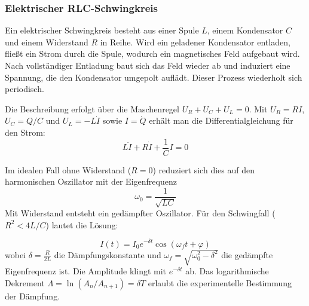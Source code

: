 \subsubsection{Elektrischer RLC-Schwingkreis}
Ein elektrischer Schwingkreis besteht aus einer Spule \(L\), einem Kondensator \(C\) und einem Widerstand \(R\) in Reihe. Wird ein geladener Kondensator entladen, fließt ein Strom durch die Spule, wodurch ein magnetisches Feld aufgebaut wird. Nach vollständiger Entladung baut sich das Feld wieder ab und induziert eine Spannung, die den Kondensator umgepolt auflädt. Dieser Prozess wiederholt sich periodisch.

Die Beschreibung erfolgt über die Maschenregel \(U_R + U_C + U_L = 0\). Mit \(U_R = RI\), \(U_C = Q/C\) und \(U_L = -L\dot{I}\) sowie \(I = \dot{Q}\) erhält man die Differentialgleichung für den Strom:
\begin{equation} \label{eq:rlc_diffgl} L \ddot{I} + R \dot{I} + \frac{1}{C} I = 0 \end{equation}

Im idealen Fall ohne Widerstand (\(R=0\)) reduziert sich dies auf den harmonischen Oszillator mit der Eigenfrequenz
\begin{equation} \label{eq:omega_0_the}
    \omega_0 = \frac{1}{\sqrt{LC}}
\end{equation}
Mit Widerstand entsteht ein gedämpfter Oszillator. Für den Schwingfall (\(R^2 < 4L/C\)) lautet die Lösung:

\begin{equation} \label{eq:rlc_loesung} I(t) = I_0 e^{-\delta t} \cos(\omega_f t + \varphi) \end{equation}
wobei \(\delta = \frac{R}{2L}\) die Dämpfungskonstante und \(\omega_f = \sqrt{\omega_0^2 - \delta^2}\) die gedämpfte Eigenfrequenz ist. Die Amplitude klingt mit \(e^{-\delta t}\) ab. Das logarithmische Dekrement \(\Lambda = \ln(A_n/A_{n+1}) = \delta T\) erlaubt die experimentelle Bestimmung der Dämpfung.

